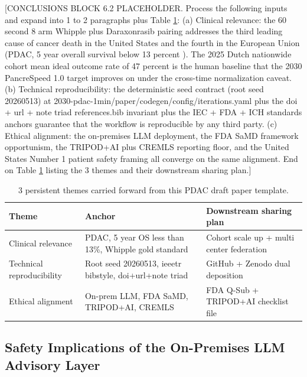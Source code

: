[CONCLUSIONS BLOCK 6.2 PLACEHOLDER. Process the following inputs and expand into 1 to 2 paragraphs plus Table \ref{tab:conclusions-themes}:
(a) Clinical relevance: the 60 second 8 arm Whipple plus Daraxonrasib pairing addresses the third leading cause of cancer death in the United States and the fourth in the European Union (PDAC, 5 year overall survival below 13 percent \cite{Siegel2025CancerStatistics}). The 2025 Dutch nationwide cohort mean ideal outcome rate of 47 percent \cite{DutchCohort2025Whipple} is the human baseline that the 2030 PancreSpeed 1.0 target improves on under the cross-time normalization caveat.
(b) Technical reproducibility: the deterministic seed contract (root seed 20260513) at 2030-pdac-1min/paper/codegen/config/iterations.yaml plus the doi + url + note triad references.bib invariant plus the IEC + FDA + ICH standards anchors guarantee that the workflow is reproducible by any third party.
(c) Ethical alignment: the on-premises LLM deployment, the FDA SaMD framework opportunism, the TRIPOD+AI plus CREMLS reporting floor, and the United States Number 1 patient safety framing all converge on the same alignment.
End on Table \ref{tab:conclusions-themes} listing the 3 themes and their downstream sharing plan.]

\begin{table}[H]
\caption{3 persistent themes carried forward from this PDAC draft paper template.}
\label{tab:conclusions-themes}
\centering
\begin{tabular}{>{\raggedright\arraybackslash}p{3.4cm} >{\raggedright\arraybackslash}p{4.6cm} >{\raggedright\arraybackslash}p{5.4cm}}
\toprule
\textbf{Theme} & \textbf{Anchor} & \textbf{Downstream sharing plan} \\
\midrule
  Clinical relevance & PDAC, 5 year OS less than 13\%, Whipple gold standard & Cohort scale up + multi center federation \\
  Technical reproducibility & Root seed 20260513, ieeetr bibstyle, doi+url+note triad & GitHub + Zenodo dual deposition \\
  Ethical alignment & On-prem LLM, FDA SaMD, TRIPOD+AI, CREMLS & FDA Q-Sub + TRIPOD+AI checklist file \\
\bottomrule
\end{tabular}
\end{table}

\subsection{Safety Implications of the On-Premises LLM Advisory Layer}
\label{sec:conclusions-safety}

